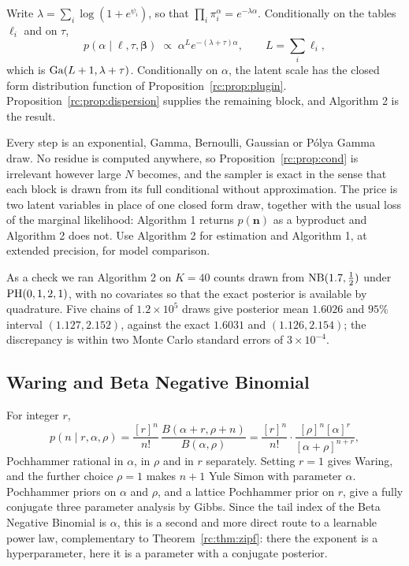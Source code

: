 Write $\lambda=\sum_i\log(1+e^{\psi_i})$, so that $\prod_i\pi_i^\alpha=e^{-\lambda\alpha}$. Conditionally on the tables $\ell_i$ and on $\tau$,
\[
p(\alpha\mid\bm\ell,\tau,\bm\beta)\;\propto\;\alpha^Le^{-(\lambda+\tau)\alpha},\qquad L=\sum_i\ell_i,
\]
which is $\mathrm{Ga}(L+1,\lambda+\tau)$. Conditionally on $\alpha$, the latent scale has the closed form distribution function of Proposition~\ref{rc:prop:plugin}. Proposition~\ref{rc:prop:dispersion} supplies the remaining block, and Algorithm 2 is the result.

Every step is an exponential, Gamma, Bernoulli, Gaussian or P\'olya Gamma draw. No residue is computed anywhere, so Proposition~\ref{rc:prop:cond} is irrelevant however large $N$ becomes, and the sampler is exact in the sense that each block is drawn from its full conditional without approximation. The price is two latent variables in place of one closed form draw, together with the usual loss of the marginal likelihood: Algorithm 1 returns $p(\bm n)$ as a byproduct and Algorithm 2 does not. Use Algorithm 2 for estimation and Algorithm 1, at extended precision, for model comparison.

As a check we ran Algorithm 2 on $K=40$ counts drawn from $\mathrm{NB}(1.7,\tfrac12)$ under $\mathrm{PH}(0,1,2,1)$, with no covariates so that the exact posterior is available by quadrature. Five chains of $1.2\times10^5$ draws give posterior mean $1.6026$ and $95\%$ interval $(1.127,2.152)$, against the exact $1.6031$ and $(1.126,2.154)$; the discrepancy is within two Monte Carlo standard errors of $3\times10^{-4}$.

\subsection{Waring and Beta Negative Binomial}\label{rc:sec:waring}

For integer $r$,
\[
p(n\mid r,\alpha,\rho)=\frac{[r]^n}{n!}\,\frac{B(\alpha+r,\rho+n)}{B(\alpha,\rho)}=\frac{[r]^n}{n!}\cdot\frac{[\rho]^n[\alpha]^r}{[\alpha+\rho]^{n+r}},
\]
Pochhammer rational in $\alpha$, in $\rho$ and in $r$ separately. Setting $r=1$ gives Waring, and the further choice $\rho=1$ makes $n+1$ Yule Simon with parameter $\alpha$. Pochhammer priors on $\alpha$ and $\rho$, and a lattice Pochhammer prior on $r$, give a fully conjugate three parameter analysis by Gibbs. Since the tail index of the Beta Negative Binomial is $\alpha$, this is a second and more direct route to a learnable power law, complementary to Theorem~\ref{rc:thm:zipf}: there the exponent is a hyperparameter, here it is a parameter with a conjugate posterior.

